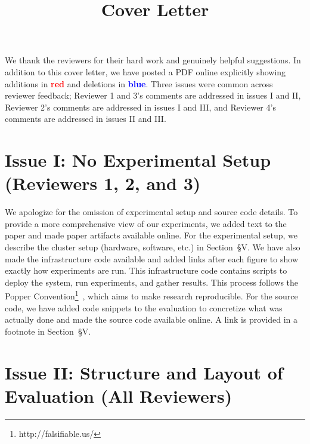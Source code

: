 \documentclass[onecolumn,conference]{IEEEtran}
\begin{document}
\title{Cover Letter}
\maketitle

We thank the reviewers for their hard work and genuinely helpful suggestions.
In addition to this cover letter, we have posted a PDF online explicitly
showing additions in \textcolor{red}{\textbf{red}} and deletions in
\textcolor{blue}{\textbf{blue}}. Three issues were common across reviewer
feedback; Reviewer 1 and 3's comments are addressed in issues I and II,
Reviewer 2's comments are addressed in issues I and III, and Reviewer 4's
comments are addressed in issues II and III. 

\section*{Issue I: No Experimental Setup (Reviewers 1, 2, and 3)}

We apologize for the omission of experimental setup and source code details. To
provide a more comprehensive view of our experiments, we added text to the
paper and made paper artifacts available online. For the experimental setup, we
describe the cluster setup (hardware, software, etc.) in Section~{\S}V.  We
have also made the infrastructure code available and added links after each
figure to show exactly how experiments are run.  This infrastructure code
contains scripts to deploy the system, run experiments, and gather results.
This process follows the Popper
Convention\footnote{http://falsifiable.us/}~\cite{jimenez_popper_2016}, which
aims to make research reproducible.  For the source code, we have added code
snippets to the evaluation to concretize what was actually done and made the
source code available online. A link is provided in a footnote in
Section~{\S}V.

\section*{Issue II: Structure and Layout of Evaluation (All Reviewers)}
\end{document}
